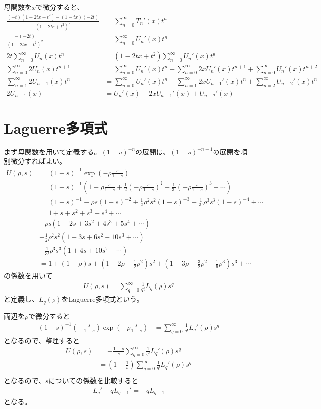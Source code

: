 \documentclass[uplatex]{jsarticle}
\begin{document}
母関数を$x$で微分すると、
\begin{align*}
\frac{(-t)(1-2tx+t^2)-(1-tx)(-2t)}{(1-2tx+t^2)^2}&=\sum^\infty_{n=0}T_n'(x)t^n\\
\frac{-(-2t)}{(1-2tx+t^2)^2}&=\sum^\infty_{n=0}U_n'(x)t^n\\
2t\sum^\infty_{n=0}U_n(x)t^n&=(1-2tx+t^2)\sum^\infty_{n=0}U_n'(x)t^n\\
\sum^\infty_{n=0}2U_n(x)t^{n+1}&=\sum^\infty_{n=0}U_n'(x)t^n-\sum^\infty_{n=0}2xU_n'(x)t^{n+1}+\sum^\infty_{n=0}U_n'(x)t^{n+2}\\
\sum^\infty_{n=1}2U_{n-1}(x)t^{n}&=\sum^\infty_{n=0}U_n'(x)t^n-\sum^\infty_{n=1}2xU_{n-1}'(x)t^{n}+\sum^\infty_{n=2}U_{n-2}'(x)t^{n}\\
2U_{n-1}(x)&=U_n'(x)-2xU_{n-1}'(x)+U_{n-2}'(x)
\end{align*}

\section{Laguerre多項式}
まず母関数を用いて定義する。$(1-s)^{-n}$の展開は、$(1-s)^{-n+1}$の展開を項別微分すればよい。
\begin{align*}
U(\rho,s)&=(1-s)^{-1}\exp(-\rho\frac{s}{1-s})\\
&=(1-s)^{-1}(1-\rho\frac{s}{1-s}+\frac{1}{2}(-\rho\frac{s}{1-s})^2+\frac{1}{3!}(-\rho\frac{s}{1-s})^3+\cdots)\\
&=(1-s)^{-1}-\rho s(1-s)^{-2}+\frac{1}{2}\rho^2s^2(1-s)^{-3}-\frac{1}{3!}\rho^3s^3(1-s)^{-4}+\cdots\\
&=1+s+s^2+s^3+s^4+\cdots\\
&-\rho s(1+2s+3s^2+4s^3+5s^4+\cdots)\\
&+\frac{1}{2}\rho^2s^2(1+3s+6s^2+10s^3+\cdots)\\
&-\frac{1}{3!}\rho^3s^3(1+4s+10s^2+\cdots)\\
&=1+(1-\rho)s+(1-2\rho+\frac{1}{2}\rho^2)s^2+(1-3\rho+\frac{3}{2}\rho^2-\frac{1}{6}\rho^3)s^3+\cdots
\end{align*}
の係数を用いて
\begin{align*}
U(\rho,s)=\sum^\infty_{q=0}\frac{1}{q!}L_q(\rho)s^q
\end{align*}
と定義し、$L_q(\rho)$をLaguerre多項式という。

両辺を$\rho$で微分すると
\begin{align*}
(1-s)^{-1}(-\frac{s}{1-s})\exp(-\rho\frac{s}{1-s})&=\sum^\infty_{q=0}\frac{1}{q!}L_q'(\rho)s^q
\end{align*}
となるので、整理すると
\begin{align*}
U(\rho,s)&=-\frac{1-s}{s}\sum^\infty_{q=0}\frac{1}{q!}L_q'(\rho)s^q\\
&=(1-\frac{1}{s})\sum^\infty_{q=0}\frac{1}{q!}L_q'(\rho)s^q\\
\end{align*}
となるので、$s$についての係数を比較すると
\begin{align*}
L_q'-qL_{q-1}'=-qL_{q-1}
\end{align*}
となる。
\end{document}
